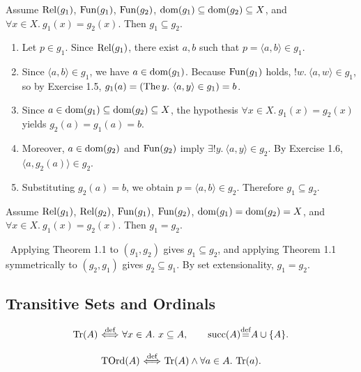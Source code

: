 \documentclass[10pt,a4paper]{article}
\begin{document}
\begin{theorem}
Assume ${\textrm{Rel}}(g_1)$, ${\textrm{Fun}}(g_1)$, ${\textrm{Fun}}(g_2)$, ${\textrm{dom}}(g_1)\subseteq{\textrm{dom}}(g_2)\subseteq X$, and $\forall x\in X.\ g_1(x)=g_2(x)$. Then $g_1\subseteq g_2$.
\end{theorem}
\myprf
\begin{enumerate}
\item Let $p \in g_1$. Since ${\textrm{Rel}}(g_1)$, there exist $a, b$ such that $p = \langle a, b\rangle \in g_1$.
\item Since $\langle a, b\rangle \in g_1$, we have $a \in {\textrm{dom}}(g_1)$. Because ${\textrm{Fun}}(g_1)$ holds, $!w.\ \langle a,w\rangle \in g_1$, so by Exercise 1.5, $g_1(a) = (\The y.\ \langle a,y\rangle \in g_1) = b$.
\item Since $a \in {\textrm{dom}}(g_1) \subseteq {\textrm{dom}}(g_2) \subseteq X$, the hypothesis $\forall x \in X.\ g_1(x) = g_2(x)$ yields $g_2(a) = g_1(a) = b$.
\item Moreover, $a \in {\textrm{dom}}(g_2)$ and ${\textrm{Fun}}(g_2)$ imply $\exists !y.\ \langle a,y\rangle \in g_2$. By Exercise 1.6, $\langle a, g_2(a)\rangle \in g_2$.
\item Substituting $g_2(a) = b$, we obtain $p = \langle a, b\rangle \in g_2$. Therefore $g_1 \subseteq g_2$.
\end{enumerate}
\myqed

\begin{theorem}
Assume ${\textrm{Rel}}(g_1)$, ${\textrm{Rel}}(g_2)$, ${\textrm{Fun}}(g_1)$, ${\textrm{Fun}}(g_2)$, ${\textrm{dom}}(g_1) = {\textrm{dom}}(g_2) = X$, and $\forall x\in X.\ g_1(x)=g_2(x)$. Then $g_1 = g_2$.
\end{theorem}
\myprf\ Applying Theorem 1.1 to $(g_1, g_2)$ gives $g_1 \subseteq g_2$, and applying Theorem 1.1 symmetrically to $(g_2, g_1)$ gives $g_2 \subseteq g_1$. By set extensionality, $g_1 = g_2$. \myqed
\subsection{Transitive Sets and Ordinals}
\begin{definition}
$$\Tr(A) \propdef \forall x\in A.\ x\subseteq A, \qquad \mysucc(A) \eqdef A \cup \{A\}.$$
\end{definition}

\begin{definition}
$${\textrm{TOrd}}(A) {\stackrel{{\textrm{def}}}{\ \Longleftrightarrow\ }} {\textrm{Tr}}(A)\land \forall a\in A.\ {\textrm{Tr}}(a).$$
\end{definition}
\end{document}
